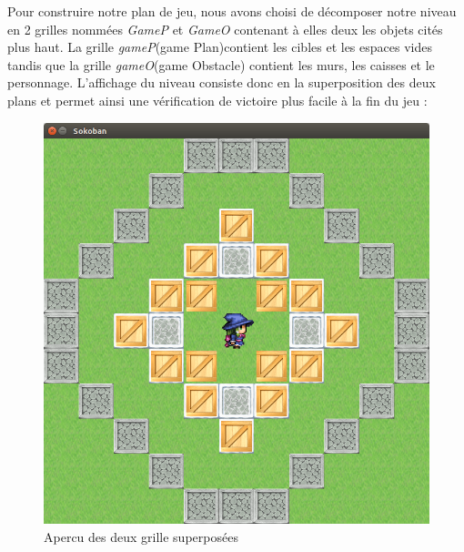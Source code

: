 \documentclass{article}
\begin{document}
Pour construire notre plan de jeu, nous avons choisi de décomposer notre niveau en 2 grilles nommées \textit{GameP} et \textit{GameO} contenant à elles deux les objets cités plus haut. La grille \textit{gameP}(game Plan)contient les cibles et les espaces vides tandis que la grille \textit{gameO}(game Obstacle) contient les murs, les caisses et le personnage. L'affichage du niveau consiste donc en la superposition des deux plans et permet ainsi une vérification de victoire plus facile à la fin du jeu : 
\begin{figure}[!h]
\centering
\includegraphics[scale=0.25]{img/05.png}
\caption{Apercu des deux grille superposées}
\end{figure}
\end{document}
